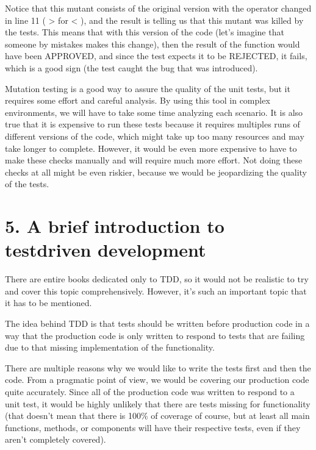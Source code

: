 \documentclass[a4paper,10pt,english]{sphinxmanual}
\begin{document}
Notice that this mutant consists of the original version with the operator changed in line 11
( \textgreater{} for \textless{} ), and the result is telling us that this mutant was killed by the tests. This means that
with this version of the code (let’s imagine that someone by mistakes makes this change),
then the result of the function would have been APPROVED, and since the test expects it to
be REJECTED, it fails, which is a good sign (the test caught the bug that was introduced).

Mutation testing is a good way to assure the quality of the unit tests, but it requires some
effort and careful analysis. By using this tool in complex environments, we will have to take
some time analyzing each scenario. It is also true that it is expensive to run these tests
because it requires multiples runs of different versions of the code, which might take up too
many resources and may take longer to complete. However, it would be even more
expensive to have to make these checks manually and will require much more effort. Not
doing these checks at all might be even riskier, because we would be jeopardizing the
quality of the tests.


\section{5. A brief introduction to test\sphinxhyphen{}driven development}
\label{\detokenize{chapters/8_unit_testing/index:a-brief-introduction-to-test-driven-development}}
There are entire books dedicated only to TDD, so it would not be realistic to try and cover
this topic comprehensively. However, it’s such an important topic that it has to
be mentioned.

The idea behind TDD is that tests should be written before production code in a way that
the production code is only written to respond to tests that are failing due to that missing
implementation of the functionality.

There are multiple reasons why we would like to write the tests first and then the code.
From a pragmatic point of view, we would be covering our production code quite
accurately. Since all of the production code was written to respond to a unit test, it would
be highly unlikely that there are tests missing for functionality (that doesn’t mean that there
is 100\% of coverage of course, but at least all main functions, methods, or components will
have their respective tests, even if they aren’t completely covered).
\end{document}
